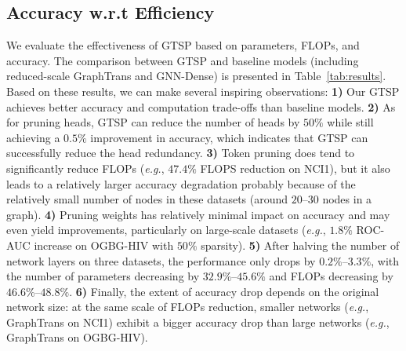 \documentclass[letterpaper]{article} %
\begin{document}
\subsection{Accuracy w.r.t Efficiency} 
\label{sec:acc}
We evaluate the effectiveness of  GTSP based on parameters, FLOPs, and accuracy. The comparison between GTSP and  baseline models (including reduced-scale GraphTrans and GNN-Dense) is presented in Table~\ref{tab:results}. Based on these results, we can make several inspiring observations: \textbf{1)} Our GTSP achieves better accuracy and computation trade-offs than baseline models. \textbf{2)} As for pruning heads, GTSP can reduce the number of heads by $50\%$ while still achieving a $0.5\%$ improvement in accuracy, which indicates that GTSP can successfully reduce the head redundancy.  \textbf{3)} Token pruning does tend to significantly reduce FLOPs (\textit{e.g.}, $47.4\%$ FLOPS reduction on NCI1), but it also leads to a relatively larger accuracy degradation probably because of the relatively small number of nodes in these datasets (around $20–30$ nodes in a graph). \textbf{4)} Pruning weights has relatively minimal impact on accuracy and may even yield improvements, particularly on large-scale datasets (\textit{e.g.},  $1.8\%$ ROC-AUC increase on OGBG-HIV with $50\%$ sparsity). \textbf{5)} After halving the number of network layers on three datasets, the performance only drops by $0.2\%–3.3\%$, with the number of parameters decreasing by $32.9\%–45.6\%$ and FLOPs decreasing by $46.6\%–48.8\%$. \textbf{6)} Finally, the extent of accuracy drop depends on the original network size: at the same scale of FLOPs reduction, smaller networks (\textit{e.g.}, GraphTrans on NCI1) exhibit a bigger accuracy drop than large networks (\textit{e.g.}, GraphTrans on OGBG-HIV).




\end{document}
